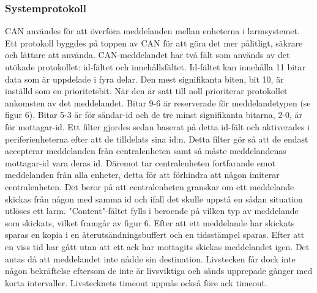 \documentclass{article}
\begin{document}
\subsubsection{Systemprotokoll}
CAN användes för att överföra meddelanden mellan enheterna i larmsystemet. 
Ett protokoll byggdes på toppen av CAN för att göra det mer pålitligt, säkrare och lättare att använda. 
CAN-meddelandet har två fält som används av det utökade protokollet: id-fältet och innehållsfältet. 
Id-fältet kan innehålla 11 bitar data som är uppdelade i fyra delar. 
Den mest signifikanta biten, bit 10, är inställd som en prioritetsbit. 
När den är satt till noll prioriterar protokollet ankomsten av det meddelandet. 
Bitar 9-6 är reserverade för meddelandetypen (se figur 6). 
Bitar 5-3 är för sändar-id och de tre minst signifikanta bitarna, 2-0, är för mottagar-id. 
Ett filter gjordes sedan baserat på detta id-fält och aktiverades i periferienheterna efter att de tilldelats sina id:n. 
Detta filter gör så att de endast accepterar meddelanden från centralenheten samt så måste meddelandenas mottagar-id vara deras id. 
Däremot tar centralenheten fortfarande emot meddelanden från alla enheter, detta för att förhindra att någon imiterar centralenheten. 
Det beror på att centralenheten granskar om ett meddelande skickas från någon med samma id och ifall det skulle uppstå en sådan situation utlöses ett larm. 
"Content"-fältet fylls i beroende på vilken typ av meddelande som skickats, vilket framgår av figur 6. 
Efter att ett meddelande har skickats sparas en kopia i en återutsändningsbuffert och en tidsstämpel sparas. 
Efter att en viss tid har gått utan att ett ack har mottagits skickas meddelandet igen. 
Det antas då att meddelandet inte nådde sin destination. 
Livstecken får dock inte någon bekräftelse eftersom de inte är livsviktiga och sänds upprepade gånger med korta intervaller. 
Livstecknets timeout uppnås också före ack timeout.
\end{document}
